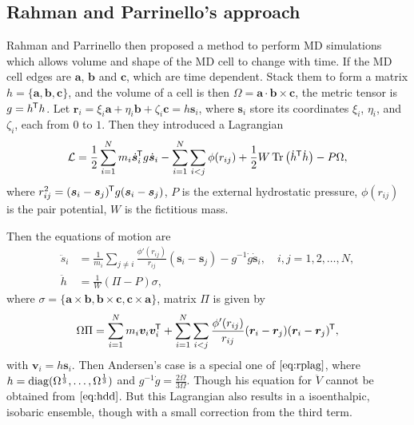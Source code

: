 \subsection{Rahman and Parrinello's approach}

Rahman and Parrinello then proposed a method to perform
MD simulations which allows volume and shape of the MD cell
to change with time.\cite{Parrinello:1980kx}
If the MD cell edges are $\bm{a}$, $\bm{b}$
and $\bm{c}$, which are time dependent. Stack them to form a
matrix $h = \{ \bm{a}, \bm{b}, \bm{c} \}$, and the volume of a cell
is then $\Omega = \bm{a} \cdot \bm{b} \times \bm{c}$, the metric
tensor is $g = h^{\mkern-1.5mu\mathsf{T}} h$. Let $\bm{r}_i = \xi_i \bm{a} + \eta_i \bm{b}
+ \zeta_i \bm{c} = h \bm{s}_i$, where $\bm{s}_i$ store its coordinates
$\xi_i$, $\eta_i$, and $\zeta_i$, each from $0$ to $1$. Then they
introduced a Lagrangian
\begin{equation}
	\mathcal{L} = \frac{ 1 }{ 2 } \sum_{i=1}^{N} m_i \dot{ \bm{s} }_i ^{\mkern-1.5mu\mathsf{T}}
	g \dot{ \bm{s} }_i - \sum_{i=1}^{N} \sum_{i<j} \phi (r_{ij}) +
	\frac{ 1 }{ 2 } W \operatorname{Tr} \big(\dot{h} ^{\mkern-1.5mu\mathsf{T}} \dot{h} \big) - P \Omega,
\end{equation}
where $r_{ij}^2 = (\bm{s}_i - \bm{s}_j)^{\mkern-1.5mu\mathsf{T}} g (\bm{s}_i - \bm{s}_j)$,
$P$ is the external hydrostatic pressure, $\phi(r_{ij})$ is the pair
potential, $W$ is the fictitious mass.

Then the equations of motion are
\begin{subequations}
\label{eq:rplag}
\begin{align}
	\ddot{s}_i & = \frac{ 1 }{ m_i } \sum_{j\neq i}
	\frac{ \phi'(r_{ij}) }{ r_{ij} } (\bm{s}_i - \bm{s}_j) - g^{-1}\dot{g}
	\dot{ \bm{s} }_i, \quad i, j = 1, 2, \ldots, N,\label{eq:rpsdd}\\
	\ddot{h}   & = \frac{ 1 }{ W } (\Pi - P) \sigma, \label{eq:hdd}
\end{align}
\end{subequations}
where $\sigma = \{\bm{a}\times \bm{b},
\bm{b}\times \bm{c}, \bm{c}\times \bm{a}\}$,
matrix $\Pi$ is given by
\begin{equation}
	\Omega \Pi = \sum_{i=1}^{N} m_i \bm{v}_i \bm{v}_i^{\mkern-1.5mu\mathsf{T}}
	+ \sum_{i=1}^{N} \sum_{i<j} \frac{ \phi'(r_{ij}) }{ r_{ij} }
	(\bm{r}_i - \bm{r}_j) (\bm{r}_i - \bm{r}_j)^{\mkern-1.5mu\mathsf{T}},
\end{equation}
with $\bm{v}_i = h \bm{s}_i$.
Then Andersen's case is a special one of $\eqref{eq:rplag}$,
where $h = \operatorname{diag} (\Omega^{\frac{ 1 }{ 3 }}, \ldots,
\Omega^{\frac{ 1 }{ 3 }})$ and $g^{-1} \dot{g} =
\frac{ 2 \dot{\Omega} }{3 \Omega }$. Though his equation for
$\ddot{V}$ cannot be obtained from $\eqref{eq:hdd}$. But
this Lagrangian also results in a isoenthalpic, isobaric ensemble,
though with a small correction from the third term.


